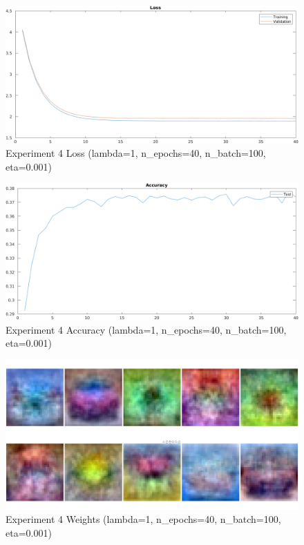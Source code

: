     \begin{figure}[ht]
        \includegraphics[width=\textwidth]{../code/result_pics/lambda=1, n_epochs=40, n_batch=100, eta=.001/loss.png}
        \caption{Experiment 4 Loss (lambda=1, n\_epochs=40, n\_batch=100, eta=0.001)}
        \label{fig:loss4}
    \end{figure}

    \begin{figure}[ht]
        \includegraphics[width=\textwidth]{../code/result_pics/lambda=1, n_epochs=40, n_batch=100, eta=.001/accuracy.png}
        \caption{Experiment 4 Accuracy (lambda=1, n\_epochs=40, n\_batch=100, eta=0.001)}
        \label{fig:accuracy4}
    \end{figure}

    \begin{figure}[ht]
        \includegraphics[width=\textwidth]{../code/result_pics/lambda=1, n_epochs=40, n_batch=100, eta=.001/weights.png}
        \caption{Experiment 4 Weights (lambda=1, n\_epochs=40, n\_batch=100, eta=0.001)}
        \label{fig:weights4}
    \end{figure}

